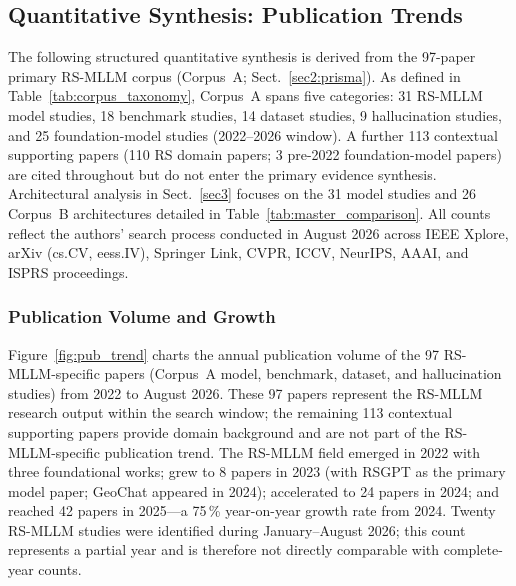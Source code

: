 \subsection{Quantitative Synthesis: Publication Trends}\label{sec8:meta}

The following structured quantitative synthesis is derived from the 97-paper
primary RS-MLLM corpus (Corpus~A; Sect.~\ref{sec2:prisma}). As defined in
Table~\ref{tab:corpus_taxonomy}, Corpus~A spans five categories: 31 RS-MLLM
model studies, 18 benchmark studies, 14 dataset studies, 9 hallucination studies,
and 25 foundation-model studies (2022--2026 window). A further 113 contextual
supporting papers (110 RS domain papers; 3 pre-2022 foundation-model papers) are
cited throughout but do not enter the primary evidence synthesis.
Architectural analysis in Sect.~\ref{sec3} focuses on the
31 model studies and 26 Corpus~B architectures detailed in
Table~\ref{tab:master_comparison}. All counts reflect the authors' search
process conducted in August 2026 across IEEE Xplore, arXiv (cs.CV, eess.IV),
Springer Link, CVPR, ICCV, NeurIPS, AAAI, and ISPRS proceedings.

\subsubsection{Publication Volume and Growth}\label{sec8:pubtrend}

Figure~\ref{fig:pub_trend} charts the annual publication volume of the 97
RS-MLLM-specific papers (Corpus~A model, benchmark, dataset, and hallucination
studies) from 2022 to August 2026. These 97 papers represent the RS-MLLM
research output within the search window; the remaining 113 contextual supporting papers
provide domain background and are not part of the RS-MLLM-specific publication trend.
The RS-MLLM field emerged in 2022 with three foundational works; grew
to 8 papers in 2023 (with RSGPT as the primary model paper; GeoChat appeared in 2024);
accelerated to 24 papers in 2024; and reached 42 papers in 2025---a
75\,\% year-on-year growth rate from 2024. Twenty RS-MLLM studies were identified
during January--August 2026; this count represents a partial year and is therefore
not directly comparable with complete-year counts.


